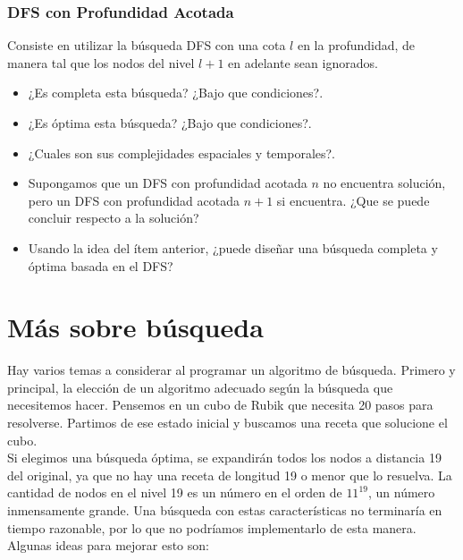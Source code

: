 \documentclass[11pt,a4paper]{article}
\begin{document}
\subsubsection{DFS con Profundidad Acotada}
Consiste en utilizar la búsqueda DFS con una cota $l$ en la profundidad, de manera tal que los nodos del nivel $l+1$ en adelante sean ignorados.
\begin{itemize}
\item ¿Es completa esta búsqueda? ¿Bajo que condiciones?.
\item ¿Es óptima esta búsqueda? ¿Bajo que condiciones?.
\item ¿Cuales son sus complejidades espaciales y temporales?.
\item Supongamos que un DFS con profundidad acotada $n$ no encuentra solución, pero un DFS con profundidad acotada $n+1$ si encuentra. ¿Que se puede concluir respecto a la solución?
\item Usando la idea del ítem anterior, ¿puede diseñar una búsqueda completa y óptima basada en el DFS?
\end{itemize}

\section{Más sobre búsqueda}
Hay varios temas a considerar al programar un algoritmo de búsqueda. Primero y principal, la elección de un algoritmo adecuado según la búsqueda que necesitemos hacer. Pensemos en un cubo de Rubik que necesita 20 pasos para resolverse. Partimos de ese estado inicial y buscamos una receta que solucione el cubo. \\

Si elegimos una búsqueda óptima, se expandirán todos los nodos a distancia 19 del original, ya que no hay una receta de longitud 19 o menor que lo resuelva\footnotemark. La cantidad de nodos en el nivel 19 es un número en el orden de $11^{19}$, un número inmensamente grande. Una búsqueda con estas características no terminaría en tiempo razonable, por lo que no podríamos implementarlo de esta manera. Algunas ideas para mejorar esto son:

\end{document}
